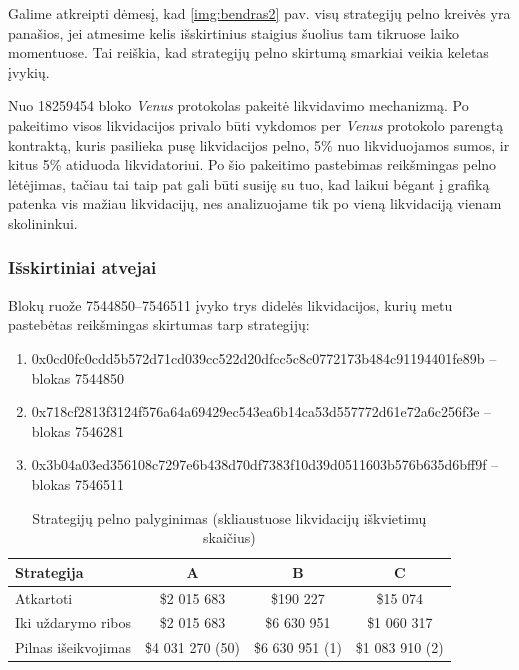 \documentclass[]{VUMIFTemplateClass}
\begin{document}
Galime atkreipti dėmesį, kad \ref{img:bendras2} pav. visų strategijų pelno kreivės yra panašios, jei atmesime kelis išskirtinius staigius šuolius tam tikruose laiko momentuose. Tai reiškia, kad strategijų pelno skirtumą smarkiai veikia keletas įvykių.

Nuo 18259454 \cite{LikvidacijosKontraktas} bloko \textit{Venus} protokolas pakeitė likvidavimo mechanizmą. Po pakeitimo visos likvidacijos privalo būti vykdomos per \textit{Venus} protokolo parengtą kontraktą, kuris pasilieka pusę likvidacijos pelno, 5\% nuo likviduojamos sumos, ir kitus 5\% atiduoda likvidatoriui. Po šio pakeitimo pastebimas reikšmingas pelno lėtėjimas, tačiau tai taip pat gali būti susiję su tuo, kad laikui bėgant į grafiką patenka vis mažiau likvidacijų, nes analizuojame tik po vieną likvidaciją vienam skolininkui.

\subsubsection{Išskirtiniai atvejai}

Blokų ruože 7544850–7546511 įvyko trys didelės likvidacijos, kurių metu pastebėtas reikšmingas skirtumas tarp strategijų:

\begin{enumerate}[label=\textbf{\Alph*.}]
    \item 0x0cd0fc0cdd5b572d71cd039cc522d20dfcc5c8c0772173b484c91194401fe89b – blokas 7544850
    \item 0x718cf2813f3124f576a64a69429ec543ea6b14ca53d557772d61e72a6c256f3e – blokas 7546281
    \item 0x3b04a03ed356108c7297e6b438d70df7383f10d39d0511603b576b635d6bff9f – blokas 7546511
\end{enumerate}

\begin{table}[h!]
  \centering
  \caption{Strategijų pelno palyginimas (skliaustuose likvidacijų iškvietimų skaičius)}
  \label{tab:profit_table}
  \begin{tabular}{|l|c|c|c|}
  \hline
  \textbf{Strategija}        & \textbf{A}          & \textbf{B}          & \textbf{C}          \\ \hline
  Atkartoti                  & \$2 015 683      & \$190 227       & \$15 074        \\ \hline
  Iki uždarymo ribos         & \$2 015 683      & \$6 630 951      & \$1 060 317      \\ \hline
  Pilnas išeikvojimas        & \$4 031 270 (50)      & \$6 630 951 (1)      & \$1 083 910 (2)      \\ \hline
  \end{tabular}
  \end{table}
\end{document}
